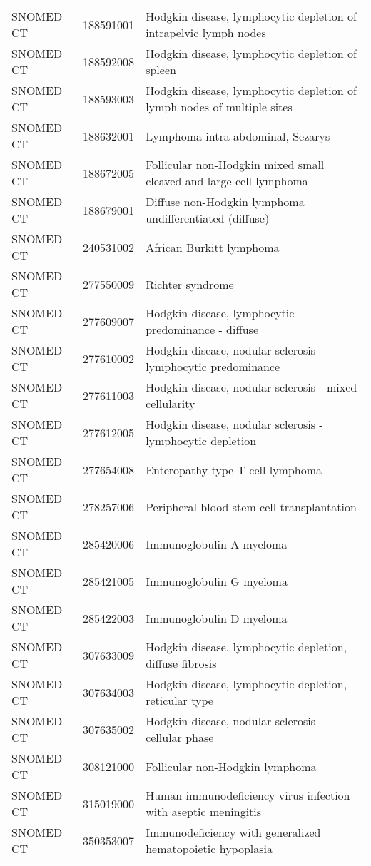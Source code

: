 \begin{longtable}{p{}p{}p{}}
  SNOMED CT & 188591001 & Hodgkin disease, lymphocytic depletion of intrapelvic lymph nodes \\ 
  SNOMED CT & 188592008 & Hodgkin disease, lymphocytic depletion of spleen \\ 
  SNOMED CT & 188593003 & Hodgkin disease, lymphocytic depletion of lymph nodes of multiple sites \\ 
  SNOMED CT & 188632001 & Lymphoma intra abdominal, Sezarys \\ 
  SNOMED CT & 188672005 & Follicular non-Hodgkin mixed small cleaved and large cell lymphoma \\ 
  SNOMED CT & 188679001 & Diffuse non-Hodgkin lymphoma undifferentiated (diffuse) \\ 
  SNOMED CT & 240531002 & African Burkitt lymphoma \\ 
  SNOMED CT & 277550009 & Richter syndrome \\ 
  SNOMED CT & 277609007 & Hodgkin disease, lymphocytic predominance - diffuse \\ 
  SNOMED CT & 277610002 & Hodgkin disease, nodular sclerosis - lymphocytic predominance \\ 
  SNOMED CT & 277611003 & Hodgkin disease, nodular sclerosis - mixed cellularity \\ 
  SNOMED CT & 277612005 & Hodgkin disease, nodular sclerosis - lymphocytic depletion \\ 
  SNOMED CT & 277654008 & Enteropathy-type T-cell lymphoma \\ 
  SNOMED CT & 278257006 & Peripheral blood stem cell transplantation \\ 
  SNOMED CT & 285420006 & Immunoglobulin A myeloma \\ 
  SNOMED CT & 285421005 & Immunoglobulin G myeloma \\ 
  SNOMED CT & 285422003 & Immunoglobulin D myeloma \\ 
  SNOMED CT & 307633009 & Hodgkin disease, lymphocytic depletion, diffuse fibrosis \\ 
  SNOMED CT & 307634003 & Hodgkin disease, lymphocytic depletion, reticular type \\ 
  SNOMED CT & 307635002 & Hodgkin disease, nodular sclerosis - cellular phase \\ 
  SNOMED CT & 308121000 & Follicular non-Hodgkin lymphoma \\ 
  SNOMED CT & 315019000 & Human immunodeficiency virus infection with aseptic meningitis \\ 
  SNOMED CT & 350353007 & Immunodeficiency with generalized hematopoietic hypoplasia \\ 

\end{longtable}
